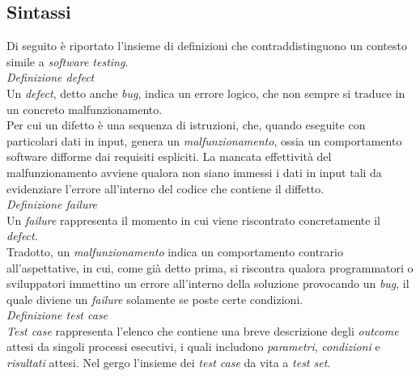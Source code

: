 \documentclass{article}
\begin{document}
\subsection*{Sintassi}
\large
Di seguito è riportato l'insieme di definizioni che contraddistinguono un contesto simile a \textit{software testing}.\vspace*{14pt}\\
\textit{Definizione defect}\\
Un \textit{defect}, detto anche \textit{bug}, indica un errore logico, che non sempre si traduce in un concreto malfunzionamento.\vspace*{7pt}\\
Per cui un difetto è una sequenza di istruzioni, che, quando eseguite con particolari dati in input, genera un \textit{malfunzionamento}, ossia un comportamento software difforme dai requisiti espliciti. La mancata effettività del malfunzionamento avviene qualora non siano immessi i dati in input tali da evidenziare l'errore all'interno del codice che contiene il diffetto.\vspace*{14pt}\\
\textit{Definizione failure}\\
Un \textit{failure} rappresenta il momento in cui viene riscontrato concretamente il \textit{defect}.\vspace*{14pt}\\
Tradotto, un \textit{malfunzionamento} indica un comportamento contrario all'aspettative, in cui, come già detto prima, si riscontra qualora programmatori o sviluppatori immettino un errore all'interno della soluzione provocando un \textit{bug}, il quale diviene un \textit{failure} solamente se poste certe condizioni.\vspace*{14pt}\\
\textit{Definizione test case}\\
\textit{Test case} rappresenta l'elenco che contiene una breve descrizione degli \textit{outcome} attesi da singoli processi esecutivi, i quali includono \textit{parametri}, \textit{condizioni} e \textit{risultati} attesi. Nel gergo l'insieme dei \textit{test case} da vita a \textit{test set}.
\end{document}
